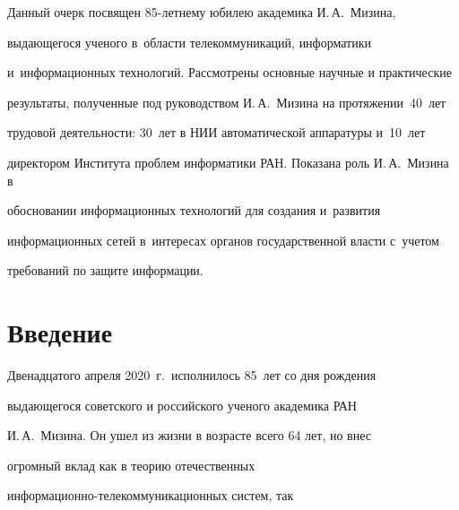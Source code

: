 \vspace*{14pt}





Данный очерк посвящен 85-летнему юбилею академика И.\,А.~Мизина, 

выдающегося ученого в~области телекоммуникаций, информатики 

и~информационных технологий. Рассмотрены основные научные и практические 

результаты, полученные под руководством И.\,А.~Мизина на протяжении~40~лет 

трудовой деятельности: 30~лет в НИИ автоматической аппаратуры и~10~лет 

директором Института проблем информатики РАН. Показана роль И.\,А.~Мизина в 

обосновании информационных технологий для создания и~развития 

информационных сетей в~интересах органов государственной власти с~учетом 

требований по защите информации. 













      

      \vspace*{-6pt} 

    

\section{Введение}



\vspace*{-2pt}



   Двенадцатого апреля 2020~г.\ исполнилось 85~лет со дня рождения 

вы\-да\-юще\-го\-ся советского и российского ученого академика РАН 

И.\,А.~Мизина. Он ушел из жизни в возрасте всего 64 лет, но внес 

огромный вклад как в теорию отечественных 

ин\-фор\-ма\-ци\-он\-но-те\-ле\-ком\-му\-ни\-ка\-ци\-он\-ных систем, так 

